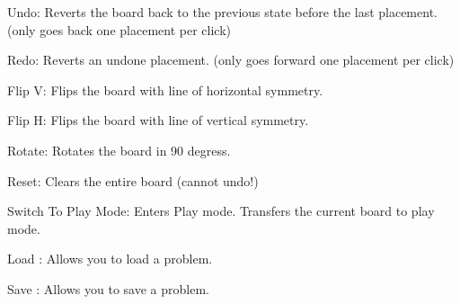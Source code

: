 \documentclass{l4proj}
\begin{document}
\begin{appendices}
Undo: Reverts the board back to the previous state before the last placement. (only goes back one placement per click)

Redo: Reverts an undone placement. (only goes forward one placement per click)

Flip V: Flips the board with line of horizontal symmetry.

Flip H: Flips the board with line of vertical  symmetry.

Rotate: Rotates the board in 90 degress.

Reset: Clears the entire board (cannot undo!)



Switch To Play Mode: Enters Play mode. Transfers the current board to play mode.

Load : Allows you to load a problem.

Save : Allows you to save a problem.



\end{appendices}





\end{document}

